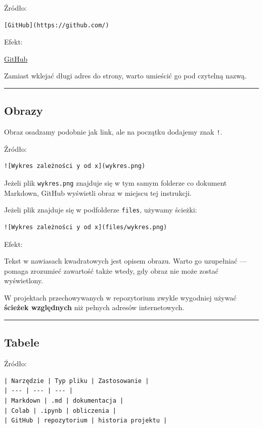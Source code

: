 \documentclass[11pt, a4paper]{article}
\begin{document}
Źródło:

\begin{verbatim}
[GitHub](https://github.com/)
\end{verbatim}

Efekt:

\href{https://github.com/}{GitHub}

Zamiast wklejać długi adres do strony, warto umieścić go pod czytelną nazwą.

\medskip\hrule\medskip

\subsection{Obrazy}

Obraz osadzamy podobnie jak link, ale na początku dodajemy znak \texttt{!}.

Źródło:

\begin{verbatim}
![Wykres zależności y od x](wykres.png)
\end{verbatim}

Jeżeli plik \texttt{wykres.png} znajduje się w tym samym folderze co dokument Markdown, GitHub wyświetli obraz w miejscu tej instrukcji.

Jeżeli plik znajduje się w podfolderze \texttt{files}, używamy ścieżki:

\begin{verbatim}
![Wykres zależności y od x](files/wykres.png)
\end{verbatim}

Efekt:


Tekst w nawiasach kwadratowych jest opisem obrazu. Warto go uzupełniać --- pomaga zrozumieć zawartość także wtedy, gdy obraz nie może zostać wyświetlony.

W projektach przechowywanych w repozytorium zwykle wygodniej używać \textbf{ścieżek względnych} niż pełnych adresów internetowych.

\medskip\hrule\medskip

\subsection{Tabele}

Źródło:

\begin{verbatim}
| Narzędzie | Typ pliku | Zastosowanie |
| --- | --- | --- |
| Markdown | .md | dokumentacja |
| Colab | .ipynb | obliczenia |
| GitHub | repozytorium | historia projektu |
\end{verbatim}
\end{document}
